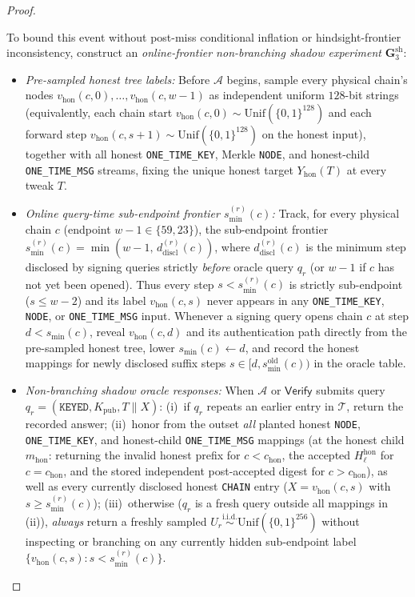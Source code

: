 \documentclass[11pt,a4paper]{article}
\theoremstyle{definition}
\theoremstyle{remark}
\newcommand{\bits}{\{0,1\}}
\newcommand{\Unif}{\mathrm{Unif}}
\begin{document}
\begin{proof}
\begin{itemize}[leftmargin=1.4em,itemsep=1pt]
\end{itemize}
To bound this event without post-miss conditional inflation or hindsight-frontier inconsistency, construct an \emph{online-frontier non-branching shadow experiment} $\mathbf{G}_3^{\mathrm{sh}}$:
\begin{itemize}[leftmargin=1.4em,itemsep=1pt]
  \item \emph{Pre-sampled honest tree labels:} Before $\mathcal{A}$ begins, sample every physical chain's nodes $v_{\mathrm{hon}}(c, 0), \dots, v_{\mathrm{hon}}(c, w{-}1)$ as independent uniform $128$-bit strings (equivalently, each chain start $v_{\mathrm{hon}}(c, 0) \sim \Unif(\bits^{128})$ and each forward step $v_{\mathrm{hon}}(c, s{+}1) \sim \Unif(\bits^{128})$ on the honest input), together with all honest \texttt{ONE\_TIME\_KEY}, Merkle \texttt{NODE}, and honest-child \texttt{ONE\_TIME\_MSG} streams, fixing the unique honest target $Y_{\mathrm{hon}}(T)$ at every tweak $T$.
  \item \emph{Online query-time sub-endpoint frontier $s_{\min}^{(r)}(c)$:} Track, for every physical chain $c$ (endpoint $w{-}1 \in \{59, 23\}$), the sub-endpoint frontier $s_{\min}^{(r)}(c) = \min(w{-}1,\, d_{\mathrm{discl}}^{(r)}(c))$, where $d_{\mathrm{discl}}^{(r)}(c)$ is the minimum step disclosed by signing queries strictly \emph{before} oracle query $q_r$ (or $w{-}1$ if $c$ has not yet been opened). Thus every step $s < s_{\min}^{(r)}(c)$ is strictly sub-endpoint ($s \le w{-}2$) and its label $v_{\mathrm{hon}}(c, s)$ never appears in any \texttt{ONE\_TIME\_KEY}, \texttt{NODE}, or \texttt{ONE\_TIME\_MSG} input. Whenever a signing query opens chain $c$ at step $d < s_{\min}(c)$, reveal $v_{\mathrm{hon}}(c, d)$ and its authentication path directly from the pre-sampled honest tree, lower $s_{\min}(c) \gets d$, and record the honest mappings for newly disclosed suffix steps $s \in [d, s_{\min}^{\mathrm{old}}(c))$ in the oracle table.
  \item \emph{Non-branching shadow oracle responses:} When $\mathcal{A}$ or $\mathsf{Verify}$ submits query $q_r = (\mathtt{KEYED}, K_{\mathrm{pub}}, T \parallel X)$: (i)~if $q_r$ repeats an earlier entry in $\mathcal{T}$, return the recorded answer; (ii)~honor from the outset \emph{all} planted honest \texttt{NODE}, \texttt{ONE\_TIME\_KEY}, and honest-child \texttt{ONE\_TIME\_MSG} mappings (at the honest child $m_{\mathrm{hon}}$: returning the invalid honest prefix for $c < c_{\mathrm{hon}}$, the accepted $H_\ell^{\mathrm{hon}}$ for $c = c_{\mathrm{hon}}$, and the stored independent post-accepted digest for $c > c_{\mathrm{hon}}$), as well as every currently disclosed honest \texttt{CHAIN} entry ($X = v_{\mathrm{hon}}(c, s)$ with $s \ge s_{\min}^{(r)}(c)$); (iii)~otherwise ($q_r$ is a fresh query outside all mappings in (ii)), \emph{always} return a freshly sampled $U_r \stackrel{\text{i.i.d.}}{\sim} \Unif(\bits^{256})$ without inspecting or branching on any currently hidden sub-endpoint label $\{v_{\mathrm{hon}}(c, s) : s < s_{\min}^{(r)}(c)\}$.

\end{itemize}
\end{proof}
\end{document}
